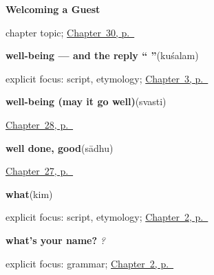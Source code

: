 \noindent\begin{minipage}[t]{\linewidth}
\raggedright
\textbf{Welcoming a Guest}\par
\footnotesize chapter topic; \hyperref[ch:sa-welcome]{Chapter~30, p.~\pageref*{ch:sa-welcome}}
\end{minipage}\par\smallskip

\noindent\begin{minipage}[t]{\linewidth}
\raggedright
\textbf{well-being — and the reply \textquotedblleft{}  \textquotedblright{}}\enspace\emph{}\enspace(kuśalam)\par
\footnotesize explicit focus: script, etymology; \hyperref[ch:responding]{Chapter~3, p.~\pageref*{ch:responding}}
\end{minipage}\par\smallskip

\noindent\begin{minipage}[t]{\linewidth}
\raggedright
\textbf{well-being (may it go well)}\enspace\emph{}\enspace(svasti)\par
\footnotesize \hyperref[ch:sa-leave-more]{Chapter~28, p.~\pageref*{ch:sa-leave-more}}
\end{minipage}\par\smallskip

\noindent\begin{minipage}[t]{\linewidth}
\raggedright
\textbf{well done, good}\enspace\emph{}\enspace(sādhu)\par
\footnotesize \hyperref[ch:sa-replies]{Chapter~27, p.~\pageref*{ch:sa-replies}}
\end{minipage}\par\smallskip

\noindent\begin{minipage}[t]{\linewidth}
\raggedright
\textbf{what}\enspace\emph{}\enspace(kim)\par
\footnotesize explicit focus: script, etymology; \hyperref[ch:introductions]{Chapter~2, p.~\pageref*{ch:introductions}}
\end{minipage}\par\smallskip

\noindent\begin{minipage}[t]{\linewidth}
\raggedright
\textbf{what's your name?}\enspace\emph{  ?}\par
\footnotesize explicit focus: grammar; \hyperref[ch:introductions]{Chapter~2, p.~\pageref*{ch:introductions}}
\end{minipage}\par\smallskip

